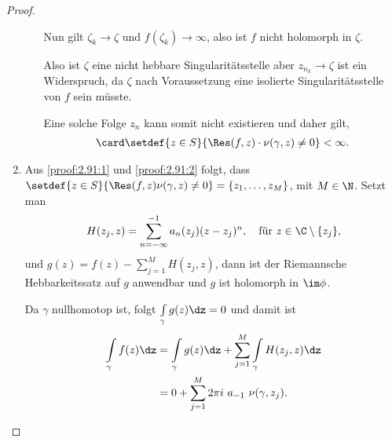 \begin{proof}
\begin{enumerate}[label=\arabic{*}.)]
\begin{enumerate}[label=(\alph{*})]
Nun gilt $\zeta_k\to\zeta$ und $f(\zeta_k)\to\infty$, also ist $f$ nicht
holomorph in $\zeta$.

Also ist $\zeta$ eine nicht hebbare Singularitätsstelle aber $z_{n_k}\to
\zeta$ ist ein Widerspruch, da $\zeta$ nach Voraussetzung eine isolierte
Singularitätsstelle von $f$ sein müsste.

Eine solche Folge $z_n$ kann somit nicht existieren und daher gilt,
\begin{align*}
\card \setdef{z\in S}{\Res(f,z)\cdot \nu(\gamma,z)\neq 0}<\infty.
\end{align*}
\end{enumerate}
\item\label{proof:2.91:3}
Aus \ref{proof:2.91:1} und \ref{proof:2.91:2} folgt, dass
$\setdef{z\in S}{\Res(f,z)\nu(\gamma,z)\neq 0} = \{z_1,\ldots,z_M\}$,  mit
$M\in\N$.
Setzt man
\begin{align*}
H(z_j,z) = \sum\limits_{n=-\infty}^{-1} a_n(z_j) (z-z_j)^n,\quad\text{für }
z\in \C\setminus\{z_j\},
\end{align*} 
und $g(z) = f(z)-\sum\limits_{j=1}^M H(z_j,z)$, dann
ist der Riemannsche Hebbarkeitssatz auf $g$ anwendbar und $g$ ist holomorph in
$\im\phi$.

Da $\gamma$ nullhomotop ist, folgt $\int\limits_\gamma g(z)\dz = 0$ und damit
ist
\begin{align*}
\int\limits_\gamma f(z)\dz
&= \int\limits_\gamma g(z)\dz + \sum\limits_{j=1}^M \int\limits_\gamma
H(z_j,z)\dz \\ &= 0 + \sum\limits_{j=1}^M 2\pi i\ a_{-1}\ \nu
(\gamma,z_j).\qedhere
\end{align*}
\end{enumerate}
\end{proof}


